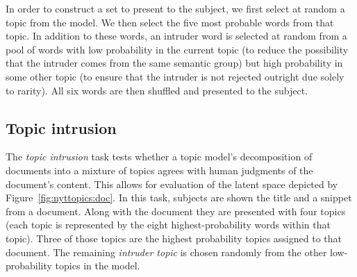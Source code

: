 
In order to construct a set to present to the subject, we first select
at random a topic from the model.  We then select the five most probable
words from that topic.  In addition to these words, an intruder word
is selected at random from a pool of words with low probability in the
current topic (to reduce the possibility that the intruder comes from
the same semantic group) but high probability in some other topic (to
ensure that the intruder is not rejected outright due solely to
rarity).  All six words are then shuffled and presented to the subject.


\subsection{Topic intrusion}
\label{sec:topicintrusion}

The \emph{topic intrusion} task tests whether a topic model's
decomposition of documents into a mixture of topics agrees with human
judgments of the document's content.  This allows for evaluation
of the latent space depicted by Figure~\ref{fig:nyttopics:doc}.  In
this task, subjects are shown the title and a snippet from a document.
Along with the document they are presented with four topics (each
topic is represented by the eight highest-probability words within
that topic).  Three of those topics are the highest probability topics
assigned to that document.  The remaining \emph{intruder topic} is
chosen randomly from the other low-probability topics in the model.



